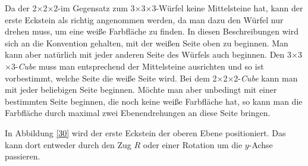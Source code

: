 \documentclass[12pt,a4paper, usenames, dvipsnames]{article}
\theoremstyle{mystyle}
\theoremstyle{definition}
\newcommand{\Ttwo}{2$\times$2$\times$2-}
\newcommand{\Tthree}{3$\times$3$\times$3-}
\begin{document}
Da der \Ttwo im Gegensatz zum \Tthree Würfel keine Mittelsteine hat, kann der erste Eckstein als richtig angenommen werden, da man dazu den Würfel nur drehen muss, um eine weiße Farbfläche zu finden.
In diesen Beschreibungen wird sich an die Konvention gehalten, mit der weißen Seite oben zu beginnen. Man kann aber natürlich mit jeder anderen Seite des Würfels auch beginnen.
Den \Tthree \textit{Cube} muss man entsprechend der Mittelsteine ausrichten und so ist vorbestimmt, welche Seite die weiße Seite wird. Bei dem \Ttwo \textit{Cube} kann man mit jeder beliebigen Seite beginnen. Möchte man aber unbedingt mit einer bestimmten Seite beginnen, die noch keine weiße Farbfläche hat, so kann man die Farbfläche durch maximal zwei Ebenendrehungen an diese Seite bringen.

In Abbildung \ref{30} wird der erste Eckstein der oberen Ebene positioniert. Das kann dort entweder durch den Zug $R$ oder einer Rotation um die $y$-Achse passieren.
\end{document}

